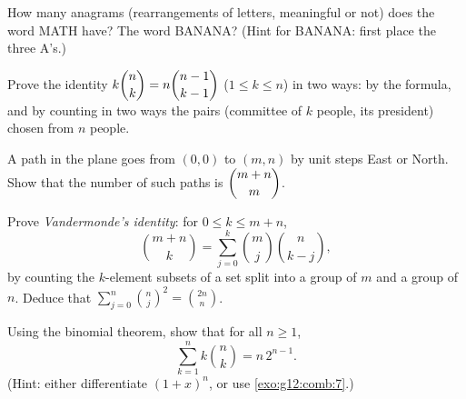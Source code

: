 \begin{exercise}[$\star\star$]\label{exo:g12:comb:6}
How many anagrams (rearrangements of letters, meaningful or not) does the
word MATH have? The word BANANA?
(Hint for BANANA: first place the three A's.)
\end{exercise}

\begin{exercise}[$\star\star$]\label{exo:g12:comb:7}
Prove the identity $k\dbinom{n}{k} = n\dbinom{n-1}{k-1}$ ($1 \leq k \leq n$)
in two ways: by the  formula, and by counting in two ways the pairs
(committee of $k$ people, its president) chosen from $n$ people.
\end{exercise}

\begin{exercise}[$\star\star$]\label{exo:g12:comb:8}
A path in the plane goes from $(0,0)$ to $(m, n)$ by unit steps East or
North. Show that the number of such paths is $\dbinom{m+n}{m}$.
\end{exercise}

\begin{exercise}[$\star\star\star$]\label{exo:g12:comb:9}
Prove \emph{Vandermonde's identity}: for $0 \leq k \leq m + n$,
\[
\binom{m+n}{k} = \sum_{j=0}^{k} \binom{m}{j}\binom{n}{k-j},
\]
by counting the $k$-element subsets of a set split into a group of $m$ and a
group of $n$. Deduce that
$\displaystyle\sum_{j=0}^{n}\binom{n}{j}^{\!2} = \binom{2n}{n}$.
\end{exercise}

\begin{exercise}[$\star\star\star$]\label{exo:g12:comb:10}
Using the binomial theorem, show that for all $n \geq 1$,
\[
\sum_{k=1}^{n} k \binom{n}{k} = n\,2^{n-1}.
\]
(Hint: either differentiate $(1+x)^n$, or use \cref{exo:g12:comb:7}.)
\end{exercise}
